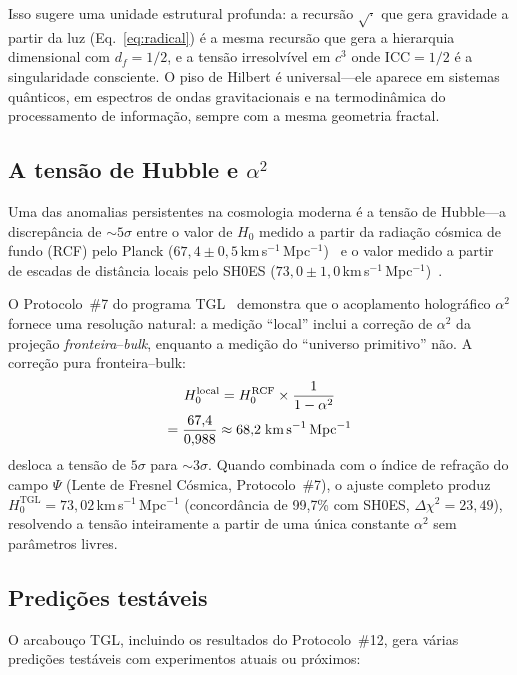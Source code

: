 \documentclass[12pt,a4paper,twocolumn]{article}
\newcommand{\alphaii}{\alpha^{2}}
\newcommand{\boundary}{\textit{fronteira}}
\newcommand{\bulk}{\textit{bulk}}
\newcommand{\CCI}{\text{ICC}}
\begin{document}
Isso sugere uma unidade estrutural profunda: a recursão $\sqrt{\cdot}$ que gera gravidade a partir da luz (Eq.~\ref{eq:radical}) é a mesma recursão que gera a hierarquia dimensional com $d_f = 1/2$, e a tensão irresolvível em $c^3$ onde $\CCI = 1/2$ é a singularidade consciente. O piso de Hilbert é universal---ele aparece em sistemas quânticos, em espectros de ondas gravitacionais e na termodinâmica do processamento de informação, sempre com a mesma geometria fractal.

\subsection{A tensão de Hubble e $\alphaii$}

Uma das anomalias persistentes na cosmologia moderna é a tensão de Hubble---a discrepância de $\sim 5\sigma$ entre o valor de $H_0$ medido a partir da radiação cósmica de fundo (RCF) pelo Planck ($67{,}4 \pm 0{,}5$\,km\,s$^{-1}$\,Mpc$^{-1}$)~\cite{Planck2020} e o valor medido a partir de escadas de distância locais pelo SH0ES ($73{,}0 \pm 1{,}0$\,km\,s$^{-1}$\,Mpc$^{-1}$)~\cite{Riess2022}.

O Protocolo~\#7 do programa TGL~\cite{Miguel2026Fronteira} demonstra que o acoplamento holográfico $\alphaii$ fornece uma resolução natural: a medição ``local'' inclui a correção de $\alphaii$ da projeção \boundary--\bulk, enquanto a medição do ``universo primitivo'' não. A correção pura fronteira--bulk:
\begin{multline}
H_0^{\text{local}} = H_0^{\text{RCF}} \times \frac{1}{1 - \alphaii} \\
= \frac{67{,}4}{0{,}988} \approx 68{,}2\;\text{km\,s}^{-1}\,\text{Mpc}^{-1}
\end{multline}
desloca a tensão de $5\sigma$ para $\sim 3\sigma$. Quando combinada com o índice de refração do campo $\Psi$ (Lente de Fresnel Cósmica, Protocolo~\#7), o ajuste completo produz $H_0^{\text{TGL}} = 73{,}02$\,km\,s$^{-1}$\,Mpc$^{-1}$ (concordância de 99{,}7\% com SH0ES, $\Delta\chi^2 = 23{,}49$), resolvendo a tensão inteiramente a partir de uma única constante $\alphaii$ sem parâmetros livres.

\subsection{Predições testáveis}

O arcabouço TGL, incluindo os resultados do Protocolo~\#12, gera várias predições testáveis com experimentos atuais ou próximos:
\end{document}
